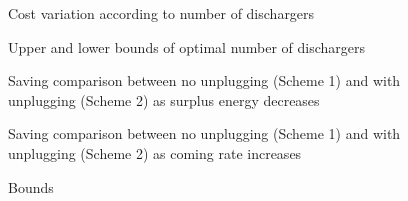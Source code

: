 \documentclass{article}
\begin{document}
\begin{figure}
\begin{center}

\caption{Cost variation according to number of dischargers}
\end{center}
\end{figure}

\begin{figure}
\begin{center}

\caption{Upper and lower bounds of optimal number of dischargers}
\end{center}
\end{figure}

\begin{figure}
\begin{center}

\caption{Saving comparison between no unplugging (Scheme 1) and with unplugging (Scheme 2) as surplus energy decreases}
\end{center}\label{fig:Eco_theta}
\end{figure}

\begin{figure}
\begin{center}

\caption{Saving comparison between no unplugging (Scheme 1) and with unplugging (Scheme 2) as coming rate increases }
\end{center}\label{fig:Eco_lambda}
\end{figure}

\begin{figure}
\begin{center}

\caption{Bounds}
\end{center}\label{fig:k_bounds_lambda}
\end{figure}
\end{document}

